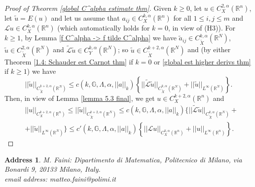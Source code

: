 \documentclass{article}
\newtheorem*{address}{Address}
\numberwithin{equation}{section}
\begin{document}
\begin{proof}[Proof of Theorem \ref{global C^alpha estimate thm}]
    Given $k \geq 0$, let $u \in C^{2,\alpha}_X(\mathbb{R}^n)$, let $\widetilde{u}=E(u)$ and let us assume that $a_{ij} \in C^{k,\alpha}_X(\mathbb{R}^n)$ for all $1 \leq i,j \leq m$ and $\mathcal{L} u \in C^{k,\alpha}_X(\mathbb{R}^n)$ (which automatically holds for $k=0$, in view of (H3)). For $k \geq 1$, by Lemma \ref{f C^alpha -> f tilde C^alpha} we have $\widetilde{a}_{ij} \in C^{k,\alpha}_{\widetilde{X}}(\mathbb{R}^N)$, $\widetilde{u} \in C^{2,\alpha}_{\widetilde{X}}(\mathbb{R}^N)$ and $\mathcal{\widetilde{L}} \widetilde{u} \in C^{k,\alpha}_Y(\mathbb{R}^N)$; so $\widetilde{u} \in C^{k+2,\alpha}_{\widetilde{X}}(\mathbb{R}^N)$ and (by either Theorem \ref{1.4: Schauder est Carnot thm} if $k=0$ or \ref{global est higher derivs thm} if $k \geq 1$) we have
    \begin{equation}
        \label{Schauder est u tilde}||\widetilde{u}||_{C^{k+2,\alpha}_{\widetilde{X}}(\mathbb{R}^N)} \leq c(k,\mathbb{G}, \Lambda, \alpha, ||a||_k) \left\{ ||\mathcal{\widetilde{L}} \widetilde{u}||_{C^{k,\alpha}_{\widetilde{X}}(\mathbb{R}^N)} + ||\widetilde{u}||_{L^{\infty}(\mathbb{R}^N)} \right\}.
    \end{equation}
    Then, in view of Lemma \ref{lemma 5.3 final}, we get $u \in C^{k+2,\alpha}_X(\mathbb{R}^n)$ and
    \begin{align*}
        & ||u||_{C^{k+2,\alpha}_X(\mathbb{R}^n)} \leq ||\widetilde{u}||_{C^{k+2,\alpha}_{\widetilde{X}}(\mathbb{R}^N)} \leq c(k,\mathbb{G}, \Lambda, \alpha, ||a||_k) \{ ||\mathcal{\widetilde{L}} \widetilde{u}||_{C^{k,\alpha}_{\widetilde{X}}(\mathbb{R}^N)} + \\
        & + ||\widetilde{u}||_{L^{\infty}(\mathbb{R}^N)} \}\leq c'(k,\mathbb{G}, \Lambda, \alpha, ||a||_k) \left\{ ||\mathcal{L} u||_{C^{k,\alpha}_X(\mathbb{R}^n)} + ||u||_{L^{\infty}(\mathbb{R}^n)} \right\}.
    \end{align*}
\end{proof}

\vspace{1cm}

\begin{address}
    M. Faini: Dipartimento di Matematica, Politecnico di Milano, via Bonardi 9, 20133 Milano, Italy.\\
    email address: matteo.faini@polimi.it
\end{address}

\vspace{5mm}
\end{document}

